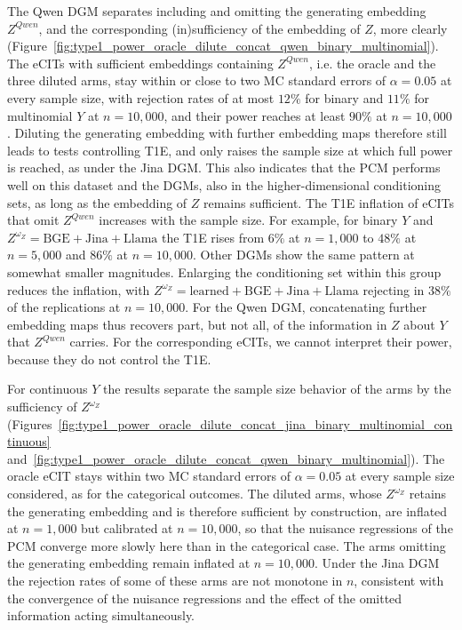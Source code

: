 \documentclass[twoside,11pt]{article}
\begin{document}
The Qwen DGM separates including and omitting the generating embedding $Z^{Qwen}$, and the corresponding (in)sufficiency of the embedding of $Z$, more clearly (Figure~\ref{fig:type1_power_oracle_dilute_concat_qwen_binary_multinomial}).
The eCITs with sufficient embeddings containing $Z^{Qwen}$, i.e. the oracle and the three diluted arms, stay within or close to two MC standard errors of $\alpha=0.05$ at every sample size, with rejection rates of at most $12\%$ for binary and $11\%$ for multinomial $Y$ at $n = 10{,}000$, and their power reaches at least $90\%$ at $n = 10{,}000$. 
Diluting the generating embedding with further embedding maps therefore still leads to tests controlling T1E, and only raises the sample size at which full power is reached, as under the Jina DGM. 
This also indicates that the PCM performs well on this dataset and the DGMs, also in the higher-dimensional conditioning sets, as long as the embedding of $Z$ remains sufficient. %
The T1E inflation of eCITs that omit $Z^{Qwen}$ increases with the sample size. For example, for binary $Y$ and $Z^{\omega_Z} = \text{BGE}+\text{Jina}+ \text{Llama}$ the T1E rises from $6\%$ at $n = 1{,}000$ to $48\%$ at $n = 5{,}000$ and $86\%$ at $n = 10{,}000$. %
Other DGMs show the same pattern at somewhat smaller magnitudes. Enlarging the conditioning set within this group reduces the inflation, with $Z^{\omega_Z} = \text{learned}+ \text{BGE}+\text{Jina}+\text{Llama}$ rejecting in $38\%$ of the replications at $n = 10{,}000$.
For the Qwen DGM, concatenating further embedding maps thus recovers part, but not all, of the information in $Z$ about $Y$ that $Z^{Qwen}$ carries. For the corresponding eCITs, we cannot interpret their power, because they do not control the T1E.

For continuous $Y$ the results separate the sample size behavior of the arms by the sufficiency of $Z^{\omega_Z}$ (Figures~\ref{fig:type1_power_oracle_dilute_concat_jina_binary_multinomial_continuous} and~\ref{fig:type1_power_oracle_dilute_concat_qwen_binary_multinomial}). 
The oracle eCIT stays within two MC standard errors of $\alpha = 0.05$ at every
sample size considered, as for the categorical outcomes. The diluted arms, whose $Z^{\omega_Z}$ retains the generating embedding and is therefore sufficient by construction, are inflated at $n = 1{,}000$ but calibrated at $n = 10{,}000$, so that the nuisance regressions of the PCM converge more slowly here than in the categorical case. 
The arms omitting the generating embedding remain inflated at $n = 10{,}000$. Under the Jina DGM the rejection rates of some of these arms are not monotone in $n$, consistent with the convergence of the nuisance regressions and the effect of the omitted information acting simultaneously.
\end{document}
